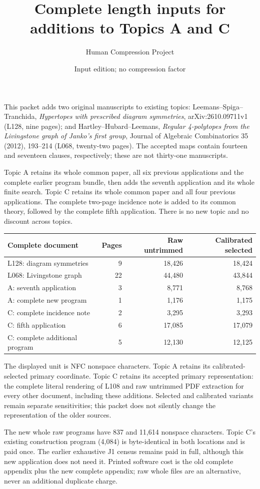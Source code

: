 \documentclass[11pt,a4paper]{article}
\title{Complete length inputs for additions to Topics A and C}\author{Human Compression Project}\date{Input edition; no compression factor}
\begin{document}
\maketitle
This packet adds two original manuscripts to existing topics: Leemans--Spiga--Tranchida, \emph{Hypertopes with prescribed diagram symmetries}, arXiv:2610.09711v1 (L128, nine pages); and Hartley--Hubard--Leemans, \emph{Regular 4-polytopes from the Livingstone graph of Janko's first group}, Journal of Algebraic Combinatorics 35 (2012), 193--214 (L068, twenty-two pages). The accepted maps contain fourteen and seventeen clauses, respectively; these are not thirty-one manuscripts.

Topic A retains its whole common paper, all six previous applications and the complete earlier program bundle, then adds the seventh application and its whole finite search. Topic C retains its whole common paper and all four previous applications. The complete two-page incidence note is added to its common theory, followed by the complete fifth application. There is no new topic and no discount across topics.

\begin{center}\small\begin{tabular}{lrrr}\toprule
Complete document & Pages & Raw untrimmed & Calibrated selected\\\midrule
L128: diagram symmetries & 9 & 18,426 & 18,424\\
L068: Livingstone graph & 22 & 44,480 & 43,844\\
A: seventh application & 3 & 8,771 & 8,768\\
A: complete new program & 1 & 1,176 & 1,175\\
C: complete incidence note & 2 & 3,295 & 3,293\\
C: fifth application & 6 & 17,085 & 17,079\\
C: complete additional program & 5 & 12,130 & 12,125\\
\bottomrule\end{tabular}\end{center}
The displayed unit is NFC nonspace characters. Topic A retains its calibrated-selected primary coordinate. Topic C retains its accepted primary representation: the complete literal rendering of L108 and raw untrimmed PDF extraction for every other document, including these additions. Selected and calibrated variants remain separate sensitivities; this packet does not silently change the representation of the older sources.

The new whole raw programs have 837 and 11,614 nonspace characters. Topic C's existing construction program (4,084) is byte-identical in both locations and is paid once. The earlier exhaustive J1 census remains paid in full, although this new application does not need it. Printed software cost is the old complete appendix plus the new complete appendix; raw whole files are an alternative, never an additional duplicate charge.
\end{document}
